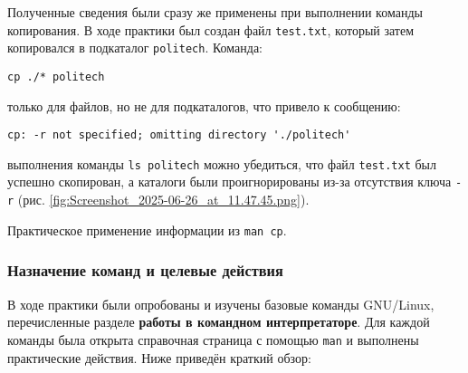 
Полученные сведения были сразу же применены при выполнении команды копирования. В ходе практики был создан файл \texttt{test.txt}, который затем копировался в подкаталог \texttt{politech}. Команда:

\begin{verbatim}
cp ./* politech
\end{verbatim}

 только для файлов, но не для подкаталогов, что привело к сообщению:

\begin{verbatim}
cp: -r not specified; omitting directory './politech'
\end{verbatim}

 выполнения команды \texttt{ls politech} можно убедиться, что файл \texttt{test.txt} был успешно скопирован, а каталоги были проигнорированы из-за отсутствия ключа \texttt{-r} (рис. \ref{fig:Screenshot_2025-06-26_at_11.47.45.png}).

{Практическое применение информации из \texttt{man cp}.}

\subsubsection{Назначение команд и целевые действия}

В ходе практики были опробованы и изучены базовые команды GNU/Linux, перечисленные разделе \textbf{ работы в командном интерпретаторе\frqq}. Для каждой команды была открыта справочная страница с помощью \texttt{man} и выполнены практические действия. Ниже приведён краткий обзор:

